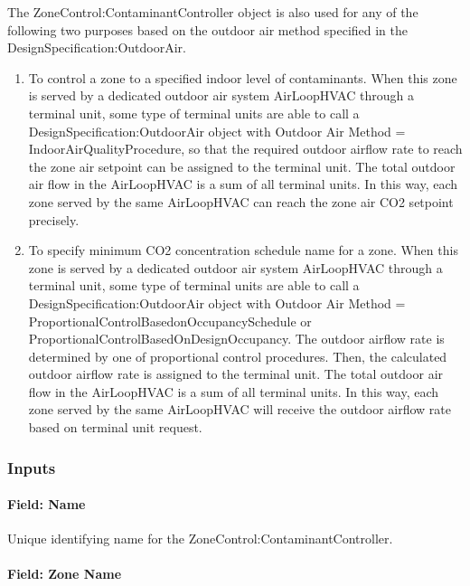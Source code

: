 The ZoneControl:ContaminantController object is also used for any of the following two purposes based on the outdoor air method specified in the DesignSpecification:OutdoorAir.

\begin{enumerate}
\def\labelenumi{\arabic{enumi})}
\item
  To control a zone to a specified indoor level of contaminants. When this zone is served by a dedicated outdoor air system AirLoopHVAC through a terminal unit, some type of terminal units are able to call a DesignSpecification:OutdoorAir object with Outdoor Air Method = IndoorAirQualityProcedure, so that the required outdoor airflow rate to reach the zone air setpoint can be assigned to the terminal unit. The total outdoor air flow in the AirLoopHVAC is a sum of all terminal units. In this way, each zone served by the same AirLoopHVAC can reach the zone air CO2 setpoint precisely.
\item
  To specify minimum CO2 concentration schedule name for a zone. When this zone is served by a dedicated outdoor air system AirLoopHVAC through a terminal unit, some type of terminal units are able to call a DesignSpecification:OutdoorAir object with Outdoor Air Method = ProportionalControlBasedonOccupancySchedule or ProportionalControlBasedOnDesignOccupancy. The outdoor airflow rate is determined by one of proportional control procedures. Then, the calculated outdoor airflow rate is assigned to the terminal unit. The total outdoor air flow in the AirLoopHVAC is a sum of all terminal units. In this way, each zone served by the same AirLoopHVAC will receive the outdoor airflow rate based on terminal unit request. 

\end{enumerate}

\subsubsection{Inputs}\label{inputs-14-017}

\paragraph{Field: Name}\label{field-name-12-013}

Unique identifying name for the ZoneControl:ContaminantController.

\paragraph{Field: Zone Name}\label{field-controlled-zone-name-000}

